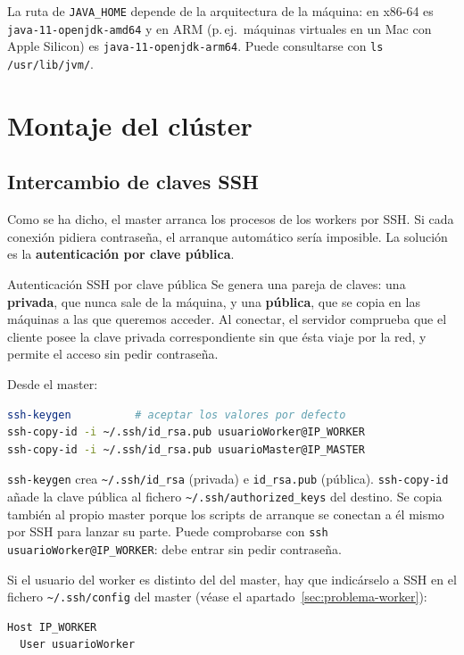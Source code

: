 \documentclass[11pt,a4paper]{article}
\begin{document}
\begin{aviso}
La ruta de \texttt{JAVA\_HOME} depende de la arquitectura de la máquina: en x86-64 es \texttt{java-11-openjdk-amd64} y en ARM (p.\,ej.\ máquinas virtuales en un Mac con Apple Silicon) es \texttt{java-11-openjdk-arm64}. Puede consultarse con \texttt{ls /usr/lib/jvm/}.
\end{aviso}

\section{Montaje del clúster}

\subsection{Intercambio de claves SSH}

Como se ha dicho, el master arranca los procesos de los workers por SSH. Si cada conexión pidiera contraseña, el arranque automático sería imposible. La solución es la \textbf{autenticación por clave pública}.

\begin{concepto}{Autenticación SSH por clave pública}
Se genera una pareja de claves: una \textbf{privada}, que nunca sale de la máquina, y una \textbf{pública}, que se copia en las máquinas a las que queremos acceder. Al conectar, el servidor comprueba que el cliente posee la clave privada correspondiente sin que ésta viaje por la red, y permite el acceso sin pedir contraseña.
\end{concepto}

Desde el master:
\begin{lstlisting}[language=bash]
ssh-keygen          # aceptar los valores por defecto
ssh-copy-id -i ~/.ssh/id_rsa.pub usuarioWorker@IP_WORKER
ssh-copy-id -i ~/.ssh/id_rsa.pub usuarioMaster@IP_MASTER
\end{lstlisting}

\texttt{ssh-keygen} crea \texttt{\textasciitilde/.ssh/id\_rsa} (privada) e \texttt{id\_rsa.pub} (pública). \texttt{ssh-copy-id} añade la clave pública al fichero \texttt{\textasciitilde/.ssh/authorized\_keys} del destino. Se copia también al propio master porque los scripts de arranque se conectan a él mismo por SSH para lanzar su parte. Puede comprobarse con \texttt{ssh usuarioWorker@IP\_WORKER}: debe entrar sin pedir contraseña.

Si el usuario del worker es distinto del del master, hay que indicárselo a SSH en el fichero \texttt{\textasciitilde/.ssh/config} del master (véase el apartado~\ref{sec:problema-worker}):
\begin{lstlisting}
Host IP_WORKER
  User usuarioWorker
\end{lstlisting}
\end{document}
